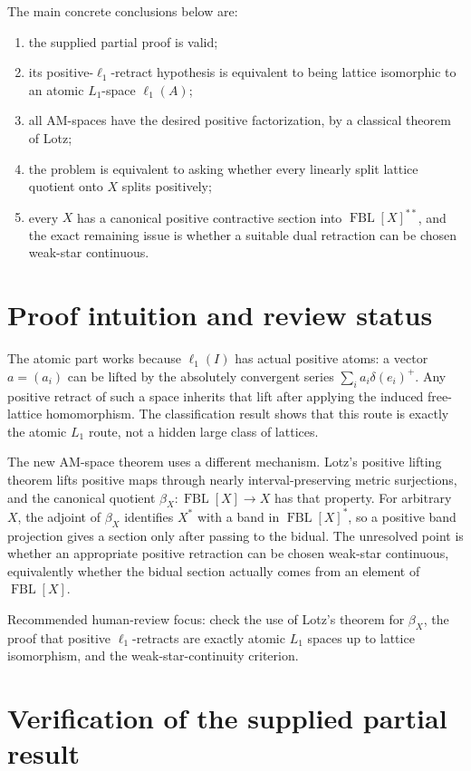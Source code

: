 \documentclass[11pt]{article}
\newcommand{\FBL}{\operatorname{FBL}}
\begin{document}
The main concrete conclusions below are:
\begin{enumerate}[label=(\roman*),leftmargin=2.2em]
\item the supplied partial proof is valid;
\item its positive-$\ell_1$-retract hypothesis is equivalent to being lattice
isomorphic to an atomic $L_1$-space $\ell_1(A)$;
\item all AM-spaces have the desired positive factorization, by a classical
theorem of Lotz;
\item the problem is equivalent to asking whether every linearly split lattice
quotient onto $X$ splits positively;
\item every $X$ has a canonical positive contractive section into
$\FBL[X]^{**}$, and the exact remaining issue is whether a suitable dual
retraction can be chosen weak-star continuous.
\end{enumerate}

\section{Proof intuition and review status}

The atomic part works because $\ell_1(I)$ has actual positive atoms: a vector
$a=(a_i)$ can be lifted by the absolutely convergent series
$\sum_i a_i\delta(e_i)^+$.  Any positive retract of such a space inherits that
lift after applying the induced free-lattice homomorphism.  The classification
result shows that this route is exactly the atomic $L_1$ route, not a hidden
large class of lattices.

The new AM-space theorem uses a different mechanism.  Lotz's positive lifting
theorem lifts positive maps through nearly interval-preserving metric
surjections, and the canonical quotient $\beta_X:\FBL[X]\to X$ has that
property.  For arbitrary $X$, the adjoint of $\beta_X$ identifies $X^*$ with a
band in $\FBL[X]^*$, so a positive band projection gives a section only after
passing to the bidual.  The unresolved point is whether an appropriate
positive retraction can be chosen weak-star continuous, equivalently whether
the bidual section actually comes from an element of $\FBL[X]$.

Recommended human-review focus: check the use of Lotz's theorem for
$\beta_X$, the proof that positive $\ell_1$-retracts are exactly atomic
$L_1$ spaces up to lattice isomorphism, and the weak-star-continuity criterion.

\section{Verification of the supplied partial result}
\end{document}
